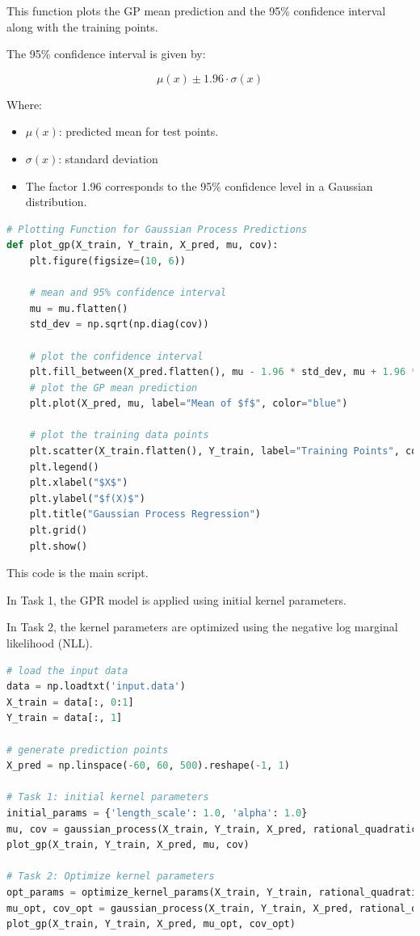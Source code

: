 \documentclass{homework}
\begin{document}
This function plots the GP mean prediction and the 95\% confidence interval along with the training points.

The 95\% confidence interval is given by:

\[
\mu(x) \pm 1.96 \cdot \sigma(x)
\]

Where:

\begin{itemize}
    \item \( \mu(x) \): predicted mean for test points.
    \item \( \sigma(x) \): standard deviation%
    \item The factor 1.96 corresponds to the 95\% confidence level in a Gaussian distribution.
\end{itemize}

\begin{lstlisting}[language=Python]
# Plotting Function for Gaussian Process Predictions
def plot_gp(X_train, Y_train, X_pred, mu, cov):
    plt.figure(figsize=(10, 6))
    
    # mean and 95% confidence interval
    mu = mu.flatten()
    std_dev = np.sqrt(np.diag(cov))
    
    # plot the confidence interval
    plt.fill_between(X_pred.flatten(), mu - 1.96 * std_dev, mu + 1.96 * std_dev, alpha=0.2, label="95% Confidence Interval")
    # plot the GP mean prediction
    plt.plot(X_pred, mu, label="Mean of $f$", color="blue")
    
    # plot the training data points
    plt.scatter(X_train.flatten(), Y_train, label="Training Points", color="red")
    plt.legend()
    plt.xlabel("$X$")
    plt.ylabel("$f(X)$")
    plt.title("Gaussian Process Regression")
    plt.grid()
    plt.show()
\end{lstlisting}

This code is the main script.

In Task 1, the GPR model is applied using initial kernel parameters.

In Task 2, the kernel parameters are optimized using the negative log marginal likelihood (NLL).

\begin{lstlisting}[language=Python]
# load the input data
data = np.loadtxt('input.data')
X_train = data[:, 0:1]
Y_train = data[:, 1]

# generate prediction points
X_pred = np.linspace(-60, 60, 500).reshape(-1, 1)

# Task 1: initial kernel parameters
initial_params = {'length_scale': 1.0, 'alpha': 1.0}
mu, cov = gaussian_process(X_train, Y_train, X_pred, rational_quadratic_kernel, beta=5, params=initial_params)
plot_gp(X_train, Y_train, X_pred, mu, cov)

# Task 2: Optimize kernel parameters
opt_params = optimize_kernel_params(X_train, Y_train, rational_quadratic_kernel, beta=5)
mu_opt, cov_opt = gaussian_process(X_train, Y_train, X_pred, rational_quadratic_kernel, beta=5, params=opt_params)
plot_gp(X_train, Y_train, X_pred, mu_opt, cov_opt)
\end{lstlisting}
\end{document}
